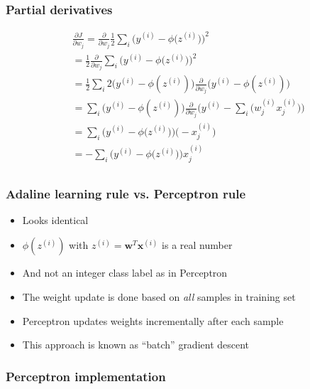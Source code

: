 \documentclass{beamer}
\begin{document}
\begin{frame}
  \frametitle{Partial derivatives}
  \begin{equation*} 
    \begin{split}
      & \frac{\partial J}{\partial w_j} = \frac{\partial}{\partial w_j} \frac{1}{2} \sum_i \bigg(  y^{(i)} - \phi \big( z^{(i)} \big)  \bigg)^2 \\
      & = \frac{1}{2} \frac{\partial}{\partial w_j} \sum_i \bigg(  y^{(i)} - \phi \big( z^{(i)} \big)  \bigg)^2 \\
      & = \frac{1}{2} \sum_i 2 \big( y^{(i)} - \phi(z^{(i)})\big)  \frac{\partial}{\partial w_j} \Big( y^{(i)}  - \phi({z^{(i)}}) \Big) \\
      & = \sum_i \big( y^{(i)}  - \phi (z^{(i)})   \big) \frac{\partial}{\partial w_j} \Big( y^{(i)} - \sum_i \big(w^{(i)}_{j} x^{(i)}_{j} \big) \Big) \\
      & = \sum_i \bigg(  y^{(i)} - \phi \big( z^{(i)} \big)  \bigg) \bigg( - x_{j}^{(i)} \bigg) \\
      & = - \sum_i \bigg(  y^{(i)} - \phi \big( z^{(i)} \big)  \bigg) x_{j}^{(i)}  \\
    \end{split}
  \end{equation*}
\end{frame}

\begin{frame}
  \frametitle{Adaline learning rule vs. Perceptron rule}
  \begin{itemize}
  \item Looks identical
  \item $\phi(z^{(i)})$ with $z^{(i)} = \mathbf{w}^T \mathbf{x}^{(i)}$ is a real number
  \item And not an integer class label as in Perceptron
  \item The weight update is done based on \emph{all} samples in training set
  \item Perceptron updates weights incrementally after each sample
    \item This approach is known as ``batch'' gradient descent
  \end{itemize}
\end{frame}

\begin{frame}
  \frametitle{Perceptron implementation}
  \href{https://github.com/rasbt/python-machine-learning-book/blob/master/code/ch02/ch02.ipynb}{}
\end{frame}
\end{document}
